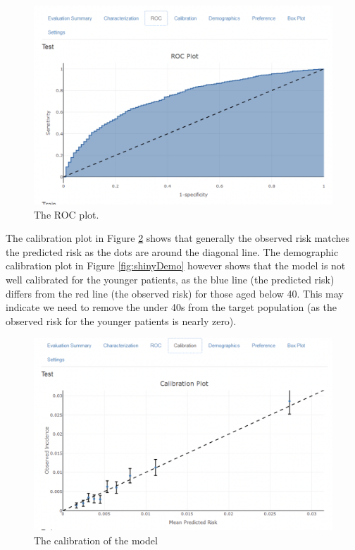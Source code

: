 \documentclass[11pt]{book}
\theoremstyle{definition}
\theoremstyle{definition}
\theoremstyle{definition}
\theoremstyle{remark}
\begin{document}
\begin{figure}

{\centering \includegraphics[width=1\linewidth]{images/PatientLevelPrediction/shiny/singleShiny/singleShinyRoc} 

}

\caption{The ROC plot.}\label{fig:shinyROC}
\end{figure}

The calibration plot in Figure \ref{fig:shinyCal} shows that generally the observed risk matches the predicted risk as the dots are around the diagonal line. The demographic calibration plot in Figure \ref{fig:shinyDemo} however shows that the model is not well calibrated for the younger patients, as the blue line (the predicted risk) differs from the red line (the observed risk) for those aged below 40. This may indicate we need to remove the under 40s from the target population (as the observed risk for the younger patients is nearly zero).

\begin{figure}

{\centering \includegraphics[width=1\linewidth]{images/PatientLevelPrediction/shiny/singleShiny/singleShinyCal} 

}

\caption{The calibration of the model}\label{fig:shinyCal}
\end{figure}
\end{document}

